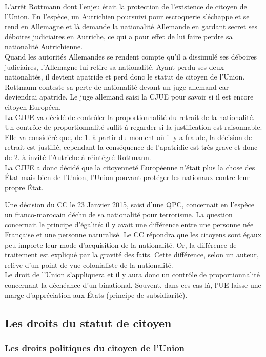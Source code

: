 \documentclass[12pt, a4paper, openany]{book}
\begin{document}
L'arrêt Rottmann dont l'enjeu était la protection de l'existence de citoyen de l'Union. En l'espèce, un Autrichien poursuivi pour escroquerie s'échappe et se rend en Allemagne et là demande la nationalité Allemande en gardant secret ses déboires judiciaires en Autriche, ce qui a pour effet de lui faire perdre sa nationalité Autrichienne. \\
Quand les autorités Allemandes se rendent compte qu'il a dissimulé ses déboires judiciaires, l'Allemagne lui retire sa nationalité. Ayant perdu ses deux nationalités, il devient apatride et perd donc le statut de citoyen de l'Union. Rottmann conteste sa perte de nationalité devant un juge allemand car deviendrai apatride. Le juge allemand saisi la CJUE pour savoir si il est encore citoyen Européen. \\
La CJUE va décidé de contrôler la proportionnalité du retrait de la nationalité. Un contrôle de proportionnalité suffit à regarder si la justification est raisonnable. Elle va considéré que, de 1. à partir du moment où il y a fraude, la décision de retrait est justifié, cependant la conséquence de l'apatridie est très grave et donc de 2. à invité l'Autriche à réintégré Rottmann. \\
La CJUE a donc décidé que la citoyenneté Européenne n'était plus la chose des État mais bien de l'Union, l'Union pouvant protéger les nationaux contre leur propre État. 


Une décision du CC le 23 Janvier 2015, saisi d'une QPC, concernait en l'espèce un franco-marocain déchu de sa nationalité pour terrorisme. La question concernait le principe d'égalité: il y avait une différence entre une personne née Française et une personne naturalisé. Le CC répondra que les citoyens sont égaux peu importe leur mode d'acquisition de la nationalité. Or, la différence de traitement est expliqué par la gravité des faits. Cette différence, selon un auteur, relève d'un point de vue colonialiste de la nationalité. \\
Le droit de l'Union s'appliquera et il y aura donc un contrôle de proportionnalité concernant la déchéance d'un binational. Souvent, dans ces cas là, l'UE laisse une marge d'appréciation aux États (principe de subsidiarité). 

\subsection{Les droits du statut de citoyen}

\subsubsection{Les droits politiques du citoyen de l'Union}
\end{document}
